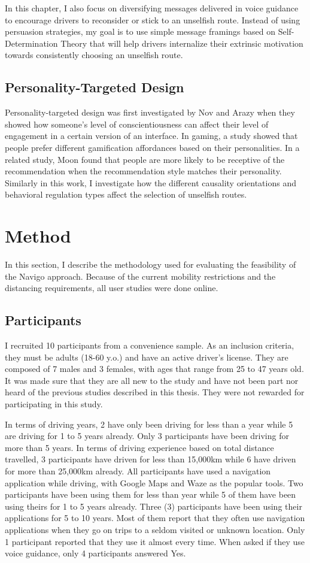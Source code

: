 In this chapter, I also focus on diversifying messages delivered in voice guidance to encourage drivers to reconsider or stick to an unselfish route. Instead of using persuasion strategies, my goal is to use simple message framings based on Self-Determination Theory that will help drivers internalize their extrinsic motivation towards consistently choosing an unselfish route. 

\subsection{Personality-Targeted Design}
Personality-targeted design was first investigated by Nov and Arazy\cite{nov2013personality} when they showed how someone's level of conscientiousness can affect their level of engagement in a certain version of an interface. In gaming, a study showed that people prefer different gamification affordances based on their personalities. In a related study, Moon\cite{moon2002personalization} found that people are more likely to be receptive of the recommendation when the recommendation style matches their personality. Similarly in this work, I investigate how the different causality orientations and behavioral regulation types affect the selection of unselfish routes.

\section{Method}
In this section, I describe the methodology used for evaluating the feasibility of the Navigo approach. Because of the current mobility restrictions and the distancing requirements, all user studies were done online.

\subsection{Participants}
I recruited 10 participants from a convenience sample. As an inclusion criteria, they must be adults (18-60 y.o.) and have an active driver's license. They are composed of 7 males and 3 females, with ages that range from 25 to 47 years old. It was made sure that they are all new to the study and have not been part nor heard of the previous studies described in this thesis. They were not rewarded for participating in this study. 

In terms of driving years, 2 have only been driving for less than a year while 5 are driving for 1 to 5 years already. Only 3 participants have been driving for more than 5 years. In terms of driving experience based on total distance travelled, 3 participants have driven for less than 15,000km while 6 have driven for more than 25,000km already. All participants have used a navigation application while driving, with Google Maps and Waze as the popular tools. Two participants have been using them for less than year while 5 of them have been using theirs for 1 to 5 years already. Three (3) participants have been using their applications for 5 to 10 years. Most of them report that they often use navigation applications when they go on trips to a seldom visited or unknown location. Only 1 participant reported that they use it almost every time. When asked if they use voice guidance, only 4 participants answered Yes. 

